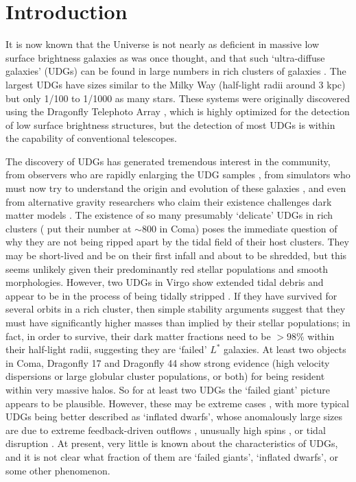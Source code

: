 \documentclass[iop,tighten,twocolumn,apj]{emulateapj}
\begin{document}
\section{Introduction}

It is now known that the Universe is not nearly as deficient in massive low
surface brightness galaxies as was once thought, and that such `ultra-diffuse
galaxies' (UDGs) can be found in large numbers in rich clusters of galaxies
\citep{vandokkum2015a,vandokkum2015b,koda2015,vdb2016}.  The largest
UDGs have sizes similar to the Milky Way (half-light radii
around 3 kpc) but only 1/100 to 1/1000 as many stars.
These systems were originally discovered using the Dragonfly Telephoto Array
\citep{abraham2014}, which is highly optimized for the detection of low
surface brightness structures, but the detection of most UDGs is within the
capability of conventional telescopes.

The discovery of UDGs has generated tremendous interest in the community, from
observers who are rapidly enlarging the UDG samples
\citep[e.g.][]{koda2015,mihos2016,vdb2016}, from simulators who must now try
to understand the origin and evolution of these galaxies
\cite[e.g.][]{yozin2015,amorisco2016a}, and even from alternative gravity
researchers who claim their existence challenges dark matter models
\citep{milgrom2015}. The existence of so many presumably `delicate' UDGs in
rich clusters (\cite{koda2015} put their number at $\sim 800$ in Coma) poses
the immediate question of why they are not being ripped apart by the tidal
field of their host clusters. They may be short-lived and be on their first
infall and about to be shredded, but this seems unlikely given their
predominantly red stellar populations and smooth morphologies.
However, two UDGs in Virgo show extended tidal debris and appear to be in the
process of being tidally stripped \citep{mihos2015,mihos2016}.
If they have survived for several orbits in a rich cluster, then simple
stability arguments suggest that they must have significantly higher masses
than implied by their stellar populations; in fact, in order to survive, their
dark matter fractions need to be $>98\%$ \citep{vandokkum2015a} within their
half-light radii, suggesting they are `failed' $L^\ast$ galaxies. At least two
objects in Coma, Dragonfly 17 \citep{peng2016} and Dragonfly 44
\citep{vandokkum2016} show strong evidence (high velocity dispersions or large
globular cluster populations, or both) for being resident within very massive
halos. So for at least two UDGs the `failed giant' picture appears to be
plausible. However, these may be extreme cases
\citep{amorisco2016b,roman2016b}, with more typical UDGs being better
described as `inflated dwarfs', whose anomalously large sizes are due to
extreme feedback-driven outflows \citep{dicintio2017}, unusually high spins
\citep{amorisco2016a}, or tidal disruption \citep{collins2014}.  At
present, very little is known about the characteristics of UDGs, and it is not
clear what fraction of them are `failed giants', `inflated dwarfs', or some
other phenomenon.
\end{document}
